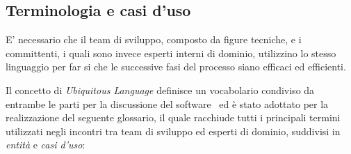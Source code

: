 \subsection{Terminologia e casi d'uso}
E' necessario che il team di sviluppo, 
composto da figure tecniche, 
e i committenti, 
i quali sono invece esperti interni di dominio, 
utilizzino lo stesso linguaggio per far si che le successive fasi del processo siano efficaci ed efficienti. 

Il concetto di \textit{Ubiquitous Language} definisce un vocabolario condiviso da entrambe le parti per la discussione del software~\cite{evans_domain-driven_2004} ed è stato adottato per la realizzazione del seguente glossario, 
il quale racchiude tutti i principali termini utilizzati negli incontri tra team di sviluppo ed esperti di dominio, 
suddivisi in \textit{entità} e \textit{casi d'uso}:

